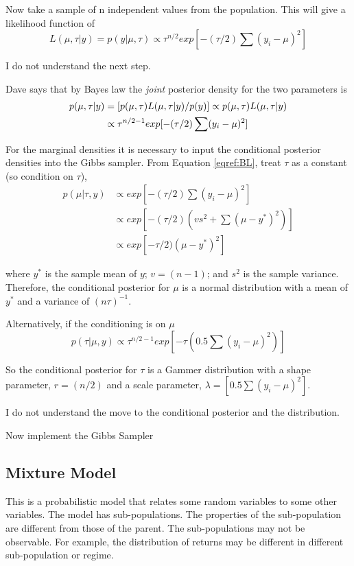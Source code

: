 \documentclass[12pt, a4paper, oneside]{article}\usepackage{graphicx, color}
\begin{document}
Now take a sample of n independent values from the population.  This will give a likelihood function of
\begin{equation}
L(\mu, \tau | y) = p(y | \mu, \tau) \propto \tau^{n/2} exp[-(\tau/2) \sum(y_i - \mu)^2]
\end{equation}

I do not understand the next step.  

Dave says that by Bayes law the \emph{joint} posterior density for the two parameters is
\begin{align}{\label{eqref:BL}}
p(\mu, \tau | y) &= [p(\mu, \tau)L(\mu, \tau | y)/ p(y)] \propto p(\mu, \tau)L(\mu, \tau |y)\\
                 &\propto \tau^{n/2 -1}exp[-(\tau/2)\sum(y_i - \mu)^2]
\end{align}

For the marginal densities it is necessary to input the conditional posterior densities into the Gibbs sampler.  
From Equation \ref{eqref:BL}, treat $\tau$ as a constant (so condition on $\tau$), 
\begin{align}
p(\mu | \tau, y) &\propto exp[-(\tau/2)\sum(y_i - \mu)^2]\\
&\propto exp[-(\tau/2) (vs^2 + \sum(\mu - y^*)^2)]\\
&\propto exp[-\tau/2)(\mu - y^*)^2]
\end{align}

where $y^*$ is the sample mean of $y$; $v = (n - 1)$; and $s^2$ is the sample variance. Therefore, the conditional posterior for $\mu$ is a normal distribution with a mean of $y^*$ and a variance of $(n\tau)^{-1}$.

Alternatively, if the conditioning is on $\mu$ 
\begin{equation}
p(\tau | \mu, y) \propto \tau^{n/2 -1}exp[-\tau(0.5\sum(y_i - \mu)^2)]
\end{equation}

So the conditional posterior for $\tau$ is a Gammer distribution with a shape parameter, $r = (n/2)$ and a scale parameter, $\lambda = [0.5\sum(y_i - \mu)^2]$. 

I do not understand the move to the conditional posterior and the distribution. 

Now implement the Gibbs Sampler


\subsection{Mixture Model}
This is a probabilistic model that relates some random variables to some other variables.  The model has sub-populations. The properties of the sub-population are different from those of the parent. The sub-populations may not be observable.  For example, the distribution of returns may be different in different sub-population or regime. 
\end{document}
